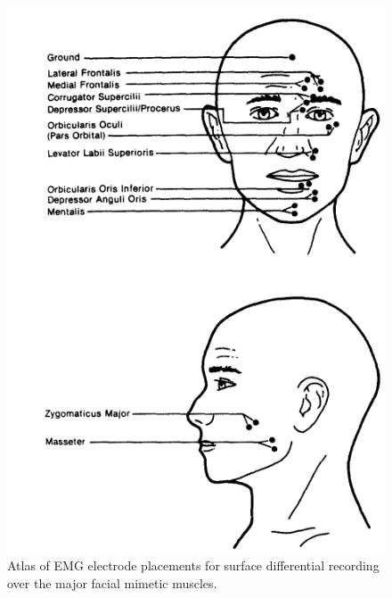 \begin{figure}[!t]
  \centering
  \includegraphics[width=0.9\linewidth]{pictures/Electrodes_placements.png}
  \caption{Atlas of EMG electrode placements for surface differential recording over the major facial mimetic muscles.
}
  \label{fig.background.emg}
\end{figure}
		
		

